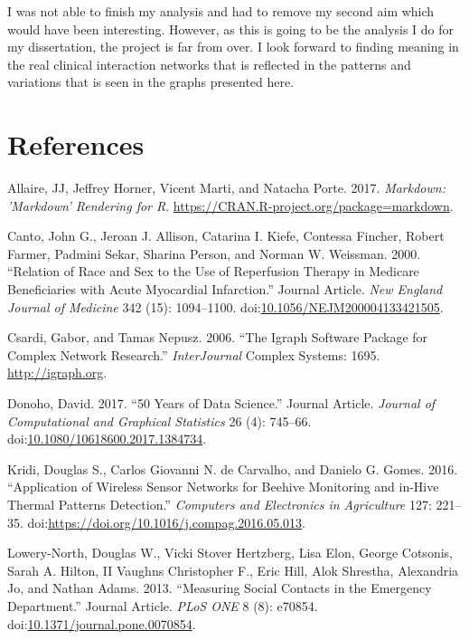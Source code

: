 \documentclass[]{elsarticle} %
\begin{document}
I was not able to finish my analysis and had to remove my second aim
which would have been interesting. However, as this is going to be the
analysis I do for my dissertation, the project is far from over. I look
forward to finding meaning in the real clinical interaction networks
that is reflected in the patterns and variations that is seen in the
graphs presented here.

\section*{References}\label{references.unnumbered}

\hypertarget{refs}{}
\hypertarget{ref-MARKDOWN}{}
Allaire, JJ, Jeffrey Horner, Vicent Marti, and Natacha Porte. 2017.
\emph{Markdown: 'Markdown' Rendering for R}.
\url{https://CRAN.R-project.org/package=markdown}.

\hypertarget{ref-RN602}{}
Canto, John G., Jeroan J. Allison, Catarina I. Kiefe, Contessa Fincher,
Robert Farmer, Padmini Sekar, Sharina Person, and Norman W. Weissman.
2000. ``Relation of Race and Sex to the Use of Reperfusion Therapy in
Medicare Beneficiaries with Acute Myocardial Infarction.'' Journal
Article. \emph{New England Journal of Medicine} 342 (15): 1094--1100.
doi:\href{https://doi.org/10.1056/NEJM200004133421505}{10.1056/NEJM200004133421505}.

\hypertarget{ref-IGRAPH}{}
Csardi, Gabor, and Tamas Nepusz. 2006. ``The Igraph Software Package for
Complex Network Research.'' \emph{InterJournal} Complex Systems: 1695.
\url{http://igraph.org}.

\hypertarget{ref-RN794}{}
Donoho, David. 2017. ``50 Years of Data Science.'' Journal Article.
\emph{Journal of Computational and Graphical Statistics} 26 (4):
745--66.
doi:\href{https://doi.org/10.1080/10618600.2017.1384734}{10.1080/10618600.2017.1384734}.

\hypertarget{ref-BEES}{}
Kridi, Douglas S., Carlos Giovanni N. de Carvalho, and Danielo G. Gomes.
2016. ``Application of Wireless Sensor Networks for Beehive Monitoring
and in-Hive Thermal Patterns Detection.'' \emph{Computers and
Electronics in Agriculture} 127: 221--35.
doi:\href{https://doi.org/https://doi.org/10.1016/j.compag.2016.05.013}{https://doi.org/10.1016/j.compag.2016.05.013}.

\hypertarget{ref-RN1X}{}
Lowery-North, Douglas W., Vicki Stover Hertzberg, Lisa Elon, George
Cotsonis, Sarah A. Hilton, II Vaughns Christopher F., Eric Hill, Alok
Shrestha, Alexandria Jo, and Nathan Adams. 2013. ``Measuring Social
Contacts in the Emergency Department.'' Journal Article. \emph{PLoS ONE}
8 (8): e70854.
doi:\href{https://doi.org/10.1371/journal.pone.0070854}{10.1371/journal.pone.0070854}.
\end{document}
